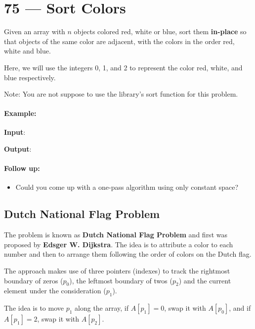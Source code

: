 \section{75 --- Sort Colors}
Given an array with $n$ objects colored red, white or blue, sort them \textbf{in-place} so that objects of the same color are adjacent, with the colors in the order red, white and blue.

Here, we will use the integers 0, 1, and 2 to represent the color red, white, and blue respectively.

Note: You are not suppose to use the library's sort function for this problem.

\paragraph{Example:}
\begin{flushleft}

\textbf{Input}: \fcj{[2,0,2,1,1,0]}

\textbf{Output}: \fcj{[0,0,1,1,2,2]}
\end{flushleft}

\paragraph{Follow up:}

\begin{itemize}
\item Could you come up with a one-pass algorithm using only constant space?
\end{itemize}

\subsection{Dutch National Flag Problem}
The problem is known as \textbf{Dutch National Flag Problem} and first was proposed by \textbf{Edsger W. Dijkstra}. The idea is to attribute a color to each number and then to arrange them following the order of colors on the Dutch flag.

The approach makes use of three pointers (indexes) to track the rightmost boundary of zeros ($p_0$), the leftmost boundary of twos ($p_2$) and the current element under the consideration ($p_1$).

The idea is to move $p_1$ along the array, if $A[p_1] = 0$, swap it with $A[p_0]$, and if $A[p_1] = 2$, swap it with $A[p_2]$.


